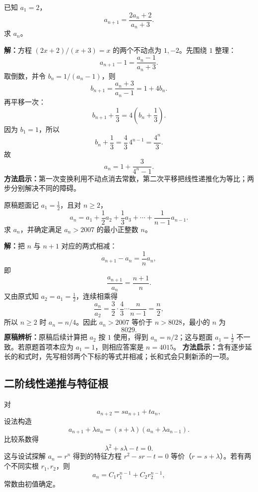\begin{examplebox}
  已知 $a_1=2$，
  \[
    a_{n+1}=\frac{2a_n+2}{a_n+3}.
  \]
  求 $a_n$。

  \textbf{解：}方程 $(2x+2)/(x+3)=x$ 的两个不动点为 $1,-2$。先围绕 $1$ 整理：
  \[
    a_{n+1}-1=\frac{a_n-1}{a_n+3}.
  \]
  取倒数，并令 $b_n=1/(a_n-1)$，则
  \[
    b_{n+1}=\frac{a_n+3}{a_n-1}=1+4b_n.
  \]
  再平移一次：
  \[
    b_{n+1}+\frac13=4\left(b_n+\frac13\right).
  \]
  因为 $b_1=1$，所以
  \[
    b_n+\frac13=\frac43\,4^{n-1}=\frac{4^n}{3}.
  \]
  故
  \[
    \boxed{a_n=1+\frac{3}{4^n-1}}.
  \]
  \textbf{方法启示：}第一次变换利用不动点消去常数，第二次平移把线性递推化为等比；两步分别解决不同的障碍。
\end{examplebox}

\begin{examplebox}
  原稿题面记 $a_1=\tfrac12$，且对 $n\ge2$，
  \[
    a_n=a_1+\frac12a_2+\frac13a_3+\cdots+\frac1{n-1}a_{n-1}.
  \]
  求 $a_n$，并确定满足 $a_n>2007$ 的最小正整数 $n$。

  \textbf{解：}把 $n$ 与 $n+1$ 对应的两式相减：
  \[
    a_{n+1}-a_n=\frac1n a_n,
  \]
  即
  \[
    \frac{a_{n+1}}{a_n}=\frac{n+1}{n}.
  \]
  又由原式知 $a_2=a_1=\tfrac12$，连续相乘得
  \[
    \frac{a_n}{a_2}=\frac32\cdot\frac43\cdots\frac n{n-1}=\frac n2,
  \]
  所以 $n\ge2$ 时 $a_n=n/4$。因此 $a_n>2007$ 等价于 $n>8028$，最小的 $n$ 为
  \[
    \boxed{8029}.
  \]
  \textbf{原稿辨析：}原稿后续计算把 $a_2$ 按 $1$ 使用，得到 $a_n=n/2$；这与题面
  $a_1=\tfrac12$ 不一致。若原题首项本应为 $a_1=1$，则相应答案是 $n=4015$。
  \textbf{方法启示：}含有逐步延长的和式时，先写相邻两个下标的等式并相减；长和式会只剩新添的一项。
\end{examplebox}

\subsection{二阶线性递推与特征根}

\begin{lawbox}[二阶常系数递推]
  对
  \[
    a_{n+2}=s a_{n+1}+t a_n,
  \]
  设法构造
  \[
    a_{n+1}+\lambda a_n=(s+\lambda)(a_n+\lambda a_{n-1}).
  \]
  比较系数得
  \[
    \lambda^2+s\lambda-t=0.
  \]
  这与设试探解 $a_n=r^n$ 得到的特征方程 $r^2-sr-t=0$ 等价（$r=s+\lambda$）。若有两个不同实根 $r_1,r_2$，则
  \[
    a_n=C_1r_1^{n-1}+C_2r_2^{n-1},
  \]
  常数由初值确定。
\end{lawbox}

